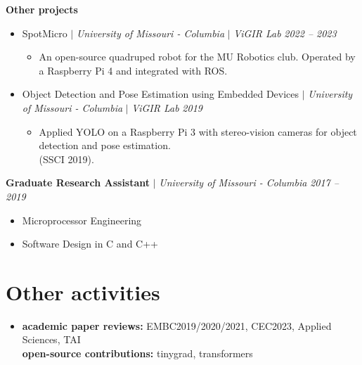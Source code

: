 \documentclass[letterpaper,10pt]{article}
\begin{document}
\textbf{Other projects}
\begin{itemize}[leftmargin=0.15in, parsep=0pt] 
  \item SpotMicro $|$ 
  \emph{University of Missouri - Columbia} $|$ 
  \emph{ViGIR Lab}
  \hfill\textit{2022 -- 2023}
  \begin{itemize}[leftmargin=0.15in, parsep=0pt]
    \item An open-source quadruped robot for the MU Robotics club. Operated by a Raspberry Pi 4 and integrated with ROS.
  \end{itemize}
  \item Object Detection and Pose Estimation using Embedded Devices $|$
   \emph{University of Missouri - Columbia} $|$ 
  \emph{ViGIR Lab}
  \hfill\textit{2019}
  \begin{itemize}[leftmargin=0.15in, parsep=0pt]
    \item Applied YOLO on a Raspberry Pi 3 with stereo-vision cameras for object detection and pose estimation.\\ (SSCI 2019).
  \end{itemize}
\end{itemize}

\textbf{Graduate Research Assistant} $|$
\emph{University of Missouri - Columbia} \hfill
\emph{2017 -- 2019}
\begin{itemize}[leftmargin=0.15in, parsep=0pt] 
  \item Microprocessor Engineering
  \item Software Design in C and C++
\end{itemize}

\nocite{*}
\printbibliography[type=inproceedings,title={Publications}]

\section{Other activities}
\begin{itemize}[leftmargin=0.15in, label={}]
  \item{
  \textbf{academic paper reviews: }{EMBC2019/2020/2021, CEC2023, Applied Sciences, TAI} \\
  \textbf{open-source contributions: }{tinygrad, transformers} \\
  }
\end{itemize}

\end{document}
